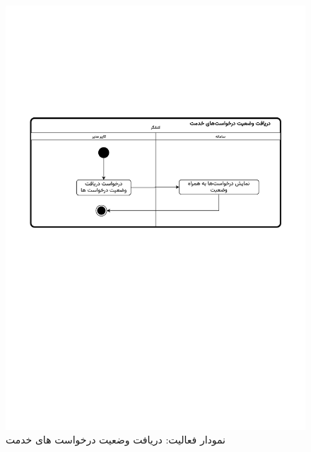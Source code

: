 \begin{figure}[ht!]
	\centering
	\includegraphics[scale=0.8, page=1]{figs/OOD-activity-vaziatreq.pdf}
	\caption{نمودار فعالیت: دریافت وضعیت درخواست های خدمت}
\end{figure}
\FloatBarrier
\newpage

